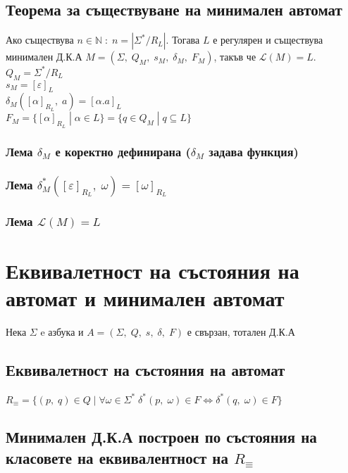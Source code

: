 \documentclass[12pt]{article}
\newcommand{\Lang}{\mathcal{L}}
\newcommand{\N}{\mathbb{N}}
\begin{document}
\subsection*{Теорема за съществуване на минимален автомат}

Ако съществува $n \in \N \; : \; n = |\Sigma^*/R_L|$. Тогава $L$ е регулярен и съществува минимален Д.К.А
$M = (\Sigma, \; Q_M, \; s_M, \; \delta_M, \; F_M)$, такъв че $\Lang(M) = L$. \\

$Q_M = \Sigma^*/R_L$ \\

$s_M = [\varepsilon]_L$ \\

$\delta_M([\alpha]_{R_L}, \; a) = [\alpha.a]_L$ \\

$F_M = \{[\alpha]_{R_L} \; | \; \alpha \in L\} = \{q \in Q_M \; | \; q \subseteq L\}$

\subsubsection*{Лема $\delta_M$ е коректно дефинирана ($\delta_M$ задава функция)}
\subsubsection*{Лема $\delta_M^*([\varepsilon]_{R_L}, \; \omega) = [\omega]_{R_L}$}
\subsubsection*{Лема $\Lang(M) = L$}

\section*{Еквивалетност на състояния на автомат и минимален автомат}

Нека $\Sigma$ e азбука и $A = (\Sigma, \; Q, \; s, \; \delta, \; F)$ е свързан, тотален Д.К.А

\subsection*{Еквивалетност на състояния на автомат}

$R_\equiv = \{(p, \; q) \in Q \; | \; \forall \omega \in \Sigma^* \; \delta^*(p, \; \omega) \in F \iff \delta^*(q, \; \omega) \in F\}$

\subsection*{Минимален Д.К.А построен по състояния на класовете на еквивалентност на $R_\equiv$}
\end{document}
